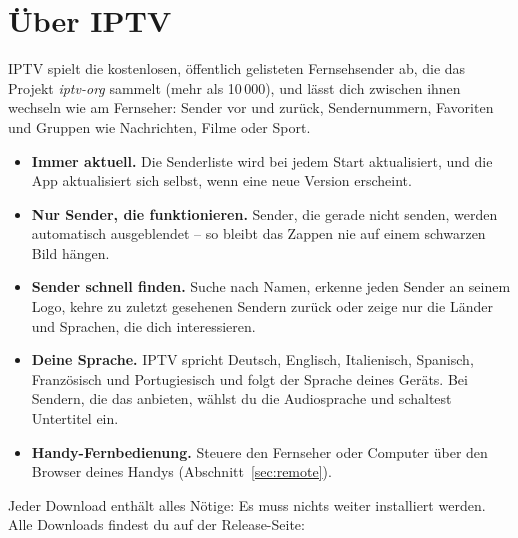 \newcommand{\GuideLang}{ngerman}
\newcommand{\GuideTitle}{Kurzanleitung}
\newcommand{\TipLabel}{Tipp:}




\section{Über IPTV}

IPTV spielt die kostenlosen, öffentlich gelisteten Fernsehsender ab, die das
Projekt \emph{iptv-org} sammelt (mehr als 10\,000), und lässt dich zwischen
ihnen wechseln wie am Fernseher: Sender vor und zurück, Sendernummern,
Favoriten und Gruppen wie Nachrichten, Filme oder Sport.

\begin{itemize}
  \item \textbf{Immer aktuell.} Die Senderliste wird bei jedem Start
        aktualisiert, und die App aktualisiert sich selbst, wenn eine neue
        Version erscheint.
  \item \textbf{Nur Sender, die funktionieren.} Sender, die gerade nicht
        senden, werden automatisch ausgeblendet -- so bleibt das Zappen nie
        auf einem schwarzen Bild hängen.
  \item \textbf{Sender schnell finden.} Suche nach Namen, erkenne jeden
        Sender an seinem Logo, kehre zu zuletzt gesehenen Sendern zurück
        oder zeige nur die Länder und Sprachen, die dich interessieren.
  \item \textbf{Deine Sprache.} IPTV spricht Deutsch, Englisch,
        Italienisch, Spanisch, Französisch und Portugiesisch und folgt der
        Sprache deines Geräts. Bei Sendern, die das anbieten, wählst du die
        Audiosprache und schaltest Untertitel ein.
  \item \textbf{Handy-Fernbedienung.} Steuere den Fernseher oder Computer
        über den Browser deines Handys (Abschnitt~\ref{sec:remote}).
\end{itemize}

Jeder Download enthält alles Nötige: Es muss nichts weiter installiert
werden. Alle Downloads findest du auf der Release-Seite:

\begin{center}
  \download
\end{center}

